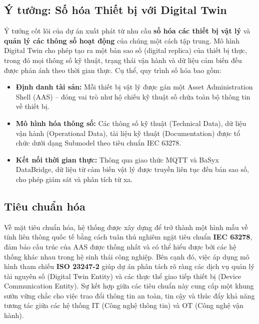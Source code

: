 \documentclass[twocolumn]{article}
\begin{document}
\subsection{Ý tưởng: Số hóa Thiết bị với Digital Twin}
Ý tưởng cốt lõi của dự án xuất phát từ nhu cầu \textbf{số hóa các thiết bị vật lý} và \textbf{quản lý các thông số hoạt động} của chúng một cách tập trung. Mô hình Digital Twin cho phép tạo ra một bản sao số (digital replica) của thiết bị thực, trong đó mọi thông số kỹ thuật, trạng thái vận hành và dữ liệu cảm biến đều được phản ánh theo thời gian thực. Cụ thể, quy trình số hóa bao gồm:

\begin{itemize}[noitemsep]
	\item \textbf{Định danh tài sản:} Mỗi thiết bị vật lý được gán một Asset Administration Shell (AAS) -- đóng vai trò như hộ chiếu kỹ thuật số chứa toàn bộ thông tin về thiết bị.
	\item \textbf{Mô hình hóa thông số:} Các thông số kỹ thuật (Technical Data), dữ liệu vận hành (Operational Data), tài liệu kỹ thuật (Documentation) được tổ chức dưới dạng Submodel theo tiêu chuẩn IEC 63278.
	\item \textbf{Kết nối thời gian thực:} Thông qua giao thức MQTT và BaSyx DataBridge, dữ liệu từ cảm biến vật lý được truyền liên tục đến bản sao số, cho phép giám sát và phân tích từ xa.
\end{itemize}

\subsection{Tiêu chuẩn hóa}
Về mặt tiêu chuẩn hóa, hệ thống được xây dựng để trở thành một hình mẫu về tính liên thông quốc tế bằng cách tuân thủ nghiêm ngặt tiêu chuẩn \textbf{IEC 63278}, đảm bảo cấu trúc của AAS được thống nhất và có thể hiểu được bởi các hệ thống khác nhau trong hệ sinh thái công nghiệp. Bên cạnh đó, việc áp dụng mô hình tham chiếu \textbf{ISO 23247-2} giúp dự án phân tách rõ ràng các dịch vụ quản lý tài nguyên số (Digital Twin Entity) và các thực thể giao tiếp thiết bị (Device Communication Entity). Sự kết hợp giữa các tiêu chuẩn này cung cấp một khung sườn vững chắc cho việc trao đổi thông tin an toàn, tin cậy và thúc đẩy khả năng tương tác giữa các hệ thống IT (Công nghệ thông tin) và OT (Công nghệ vận hành).
\end{document}
